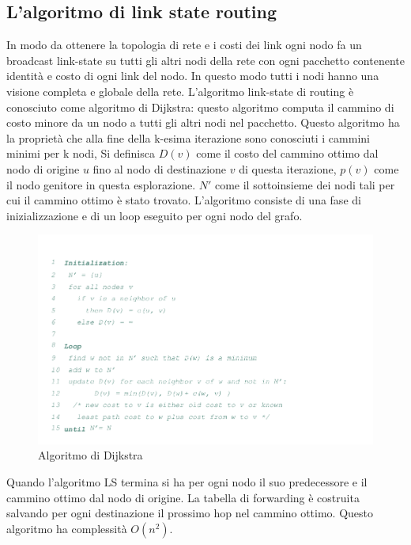 \subsection{L'algoritmo di link state routing}
In modo da ottenere la topologia di rete e i costi dei link ogni nodo fa un broadcast link-state su tutti gli altri nodi della rete con ogni pacchetto 
contenente identit\`a e costo di ogni link del nodo. In questo modo tutti i nodi hanno una visione completa e globale della rete. L'algoritmo link-state di
routing \`e conosciuto come algoritmo di Dijkstra: questo algoritmo computa il cammino di costo minore da un nodo a tutti gli altri nodi nel pacchetto. 
Questo algoritmo ha la propriet\`a che alla fine della k-esima iterazione sono conosciuti i cammini minimi per k nodi, Si definisca $D(v)$ come il costo 
del cammino ottimo dal nodo di origine $u$ fino al nodo di destinazione $v$ di questa iterazione, $p(v)$ come il nodo genitore in questa esplorazione. $N'$
come il sottoinsieme dei nodi tali per cui il cammino ottimo \`e stato trovato. L'algoritmo consiste di una fase di inizializzazione e di un loop eseguito
per ogni nodo del grafo. 
\begin{figure}[h]
\includegraphics[width=\textwidth]{AlgoritmoDijkstra.png}
\caption{Algoritmo di Dijkstra}
\end{figure}
Quando l'algoritmo LS termina si ha per ogni nodo il suo predecessore e il cammino ottimo dal nodo di origine. La tabella di forwarding \`e costruita 
salvando per ogni destinazione il prossimo hop nel cammino ottimo. Questo algoritmo ha complessit\`a $O(n^2)$. 
